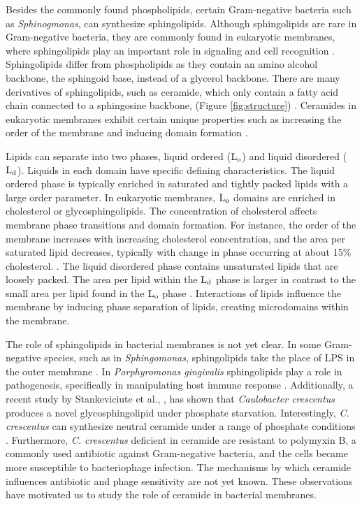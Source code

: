 \documentclass[10pt, letterpaper]{article}
\begin{document}
\par Besides the commonly found phospholipids, certain Gram-negative bacteria such as \textit{Sphinogmonas}, can synthesize sphingolipids. Although sphingolipids are rare in  Gram-negative bacteria, they are commonly found in eukaryotic membranes, where sphingolipids play an important role in signaling and cell recognition \cite{alonso2018physical, veiga1999ceramides,zhang2009ceramide}. Sphingolipids differ from phospholipids as they contain an amino alcohol backbone, the sphingoid base, instead of a glycerol backbone. There are many derivatives of sphingolipids, such as ceramide, which only contain a fatty acid chain connected to a sphingosine backbone, (Figure \ref{fig:structure}) \cite{alonso2018physical, zhang2009ceramide}. Ceramides in eukaryotic membranes exhibit certain unique properties such as increasing the order of the membrane and inducing domain formation \cite{alonso2018physical, veiga1999ceramides}. 
\par Lipids can separate into two phases, liquid ordered ($\rm L_o$) and liquid disordered ($\rm L_d$). Liquids in each domain have specific defining characteristics. The liquid ordered phase is typically enriched in saturated and tightly packed lipids with a large order parameter. In eukaryotic membranes, $\rm L_o$ domains are enriched in cholesterol or glycosphingolipids. The concentration of cholesterol affects membrane phase transitions and domain formation. For instance, the order of the membrane increases with increasing cholesterol concentration, and the area per saturated lipid decreases, typically with change in phase occurring at about 15\% cholesterol. \cite{wang2016dppc}. The liquid disordered phase contains unsaturated lipids that are loosely packed. The area per lipid within the $\rm L_d$ phase is larger in contrast to the small area per lipid found in the $\rm L_o$ phase \cite{van2008membrane}. Interactions of lipids influence the membrane by inducing phase separation of lipids, creating microdomains within the membrane.


\par The role of sphingolipids in bacterial membranes is not yet clear. In some Gram-negative species, such as in \textit{Sphingomonas}, sphingolipids take the place of LPS in the outer membrane \cite{kawasaki1994cell}. In \textit{Porphyromonas gingivalis} sphingolipids play a role in pathogenesis, specifically in manipulating host immune response \cite{rocha2020porphyromonas}. Additionally, a recent study by Stankeviciute et al., \cite{stankeviciute2019caulobacter}, has shown that \textit{Caulobacter crescentus}  produces a novel glycosphingolipid under phosphate starvation. Interestingly, \textit{C. crescentus} can synthesize neutral ceramide under a range of phosphate conditions \cite{stankeviciute2019caulobacter}. Furthermore,  \textit{C. crescentus} deficient in ceramide are resistant to polymyxin B, a commonly used antibiotic against Gram-negative bacteria, and the cells became more susceptible to bacteriophage infection. The mechanisms by which ceramide influences antibiotic and phage sensitivity are not yet known. These observations have motivated us to study the role of ceramide in bacterial membranes. 
\end{document}

